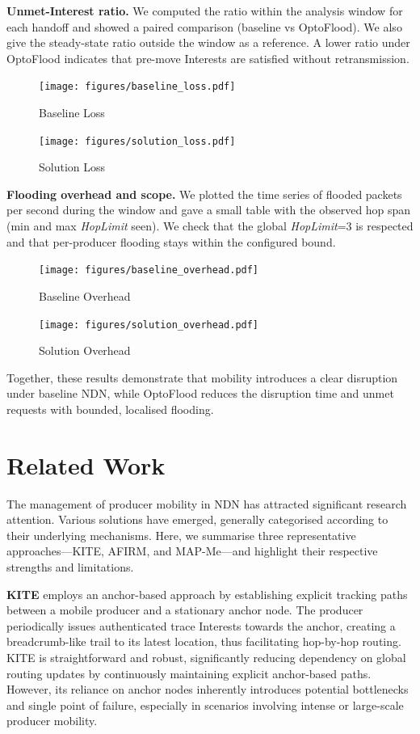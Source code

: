 \documentclass[10pt,conference]{IEEEtran}
\begin{document}
\textbf{Unmet-Interest ratio.}
We computed the ratio within the analysis window for each handoff and showed a paired comparison (baseline vs OptoFlood). We also give the steady-state ratio outside the window as a reference. A lower ratio under OptoFlood indicates that pre-move Interests are satisfied without retransmission.
\begin{figure}
    \centering
    \texttt{[image: figures/baseline\_loss.pdf]}
    \caption{Baseline Loss}
    \label{fig:baseline_loss}
\end{figure}
\begin{figure}
    \centering
    \texttt{[image: figures/solution\_loss.pdf]}
    \caption{Solution Loss}
    \label{fig:solution_loss}
\end{figure}

\textbf{Flooding overhead and scope.}
We plotted the time series of flooded packets per second during the window and gave a small table with the observed hop span (min and max \textit{HopLimit} seen). We check that the global \textit{HopLimit}=3 is respected and that per-producer flooding stays within the configured bound.
\begin{figure}
    \centering
    \texttt{[image: figures/baseline\_overhead.pdf]}
    \caption{Baseline Overhead}
    \label{fig:baseline_overhead}
\end{figure}
\begin{figure}
    \centering
    \texttt{[image: figures/solution\_overhead.pdf]}
    \caption{Solution Overhead}
    \label{fig:solution_overhead}
\end{figure}

Together, these results demonstrate that mobility introduces a clear disruption under baseline NDN, while OptoFlood reduces the disruption time and unmet requests with bounded, localised flooding.

\section{Related Work}
\label{sec:related}

The management of producer mobility in NDN has attracted significant research attention. Various solutions have emerged, generally categorised according to their underlying mechanisms. Here, we summarise three representative approaches—KITE, AFIRM, and MAP-Me—and highlight their respective strengths and limitations.

\textbf{KITE} \cite{KITE} employs an anchor-based approach by establishing explicit tracking paths between a mobile producer and a stationary anchor node. The producer periodically issues authenticated trace Interests towards the anchor, creating a breadcrumb-like trail to its latest location, thus facilitating hop-by-hop routing. KITE is straightforward and robust, significantly reducing dependency on global routing updates by continuously maintaining explicit anchor-based paths. However, its reliance on anchor nodes inherently introduces potential bottlenecks and single point of failure, especially in scenarios involving intense or large-scale producer mobility.
\end{document}
